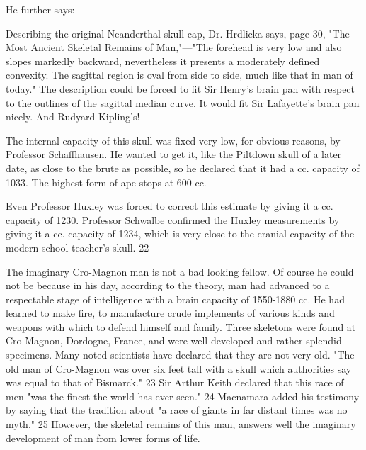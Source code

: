He further says:

Describing the original Neanderthal skull-cap, Dr. Hrdlicka says, page 30, "The Most
Ancient Skeletal Remains of Man,"—"The forehead is very low and also slopes markedly
backward, nevertheless it presents a moderately defined convexity. The sagittal region is oval
from side to side, much like that in man of today." The description could be forced to fit Sir
Henry's brain pan with respect to the outlines of the sagittal median curve. It would fit Sir
Lafayette's brain pan nicely. And Rudyard Kipling's!

The internal capacity of this skull was fixed very low, for obvious reasons, by Professor
Schaffhausen. He wanted to get it, like the Piltdown skull of a later date, as close to the brute
as possible, so he declared that it had a cc. capacity of 1033. The highest form of ape stops at
600 cc.

Even Professor Huxley was forced to correct this estimate by giving it a cc. capacity of 1230.
Professor Schwalbe confirmed the Huxley measurements by giving it a cc. capacity of 1234,
which is very close to the cranial capacity of the modern school teacher's skull. 22

The imaginary Cro-Magnon man is not a bad looking fellow. Of course he could not be
because in his day, according to the theory, man had advanced to a respectable stage of
intelligence with a brain capacity of 1550-1880 cc. He had learned to make fire, to
manufacture crude implements of various kinds and weapons with which to defend himself
and family. Three skeletons were found at Cro-Magnon, Dordogne, France, and were well
developed and rather splendid specimens. Many noted scientists have declared that they are
not very old. "The old man of Cro-Magnon was over six feet tall with a skull which
authorities say was equal to that of Bismarck." 23 Sir Arthur Keith declared that this race of
men "was the finest the world has ever seen." 24 Macnamara added his testimony by saying
that the tradition about "a race of giants in far distant times was no myth." 25 However, the
skeletal remains of this man, answers well the imaginary development of man from lower
forms of life.

